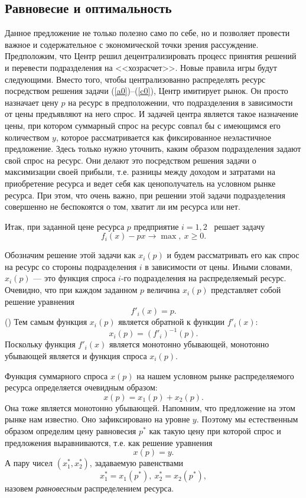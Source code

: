 \subsection{Равновесие и оптимальность}
 Данное предложение не только полезно само по себе, но и позволяет
провести важное и содержательное с экономической точки зрения рассуждение. Предположим, что
Центр решил децентрализировать процесс принятия решений и перевести подразделения на
<<хозрасчет>>. Новые правила игры будут следующими. Вместо того, чтобы централизованно
распределять ресурс посредством решения задачи (\ref{a0})--(\ref{c0}), Центр имитирует рынок.
Он просто назначает цену $p$ на ресурс в предположении, что подразделения в зависимости от
цены предъявляют на него спрос. И задачей центра является такое назначение цены, при котором
суммарный спрос на ресурс совпал бы с имеющимся его количеством $y$, которое рассматривается
как фиксированное неэластичное предложение. Здесь только нужно уточнить, каким образом
подразделения задают свой спрос на ресурс. Они делают это посредством решения задачи о
максимизации своей прибыли, т.е. разницы между доходом и затратами на приобретение ресурса и
ведет себя как ценополучатель на условном рынке ресурса. При этом, что очень важно, при
решении этой задачи подразделения совершенно не беспокоятся о том, хватит ли им ресурса или
нет.

Итак, при заданной цене ресурса $p$ предприятие $i=1,2$ \ решает
задачу
\begin{equation}
\label{max-pribili}
 f_{i}(x)-px\rightarrow\max,\ x\geqslant0.
\end{equation}


Обозначим решение этой задачи как $x_{i}(p)$ и будем рассматривать
его как спрос на ресурс со стороны подразделения $i$ в зависимости
от цены. Иными словами, $x_{i}(p)$ --- это функция спроса $i$-го
подразделения на распределяемый ресурс. Очевидно, что при каждом
заданном $p$ величина $x_{i}(p)$ представляет собой решение
уравнения
\[f'_{i}(x)=p.\]                ()
Тем самым функция $x_{i}(p)$ является обратной к функции $f'_{i}(x)$:
\begin{equation}
\label{fun-sprosa}
 x_{i}(p)=(f'_{i})^{-1}(p).
\end{equation}
Поскольку функция $f'_{i}(x)$ является монотонно убывающей,
монотонно убывающей является и функция спроса $x_{i}(p)$.

Функция суммарного спроса $x(p)$ на нашем условном рынке
распределяемого ресурса определяется очевидным образом:
\[x(p)=x_{1}(p)+x_{2}(p).\]
Она тоже является монотонно убывающей. Напомним, что предложение на
этом рынке нам известно. Оно зафиксировано на уровне $y$. Поэтому мы
естественным образом определим цену равновесия $p^{*}$ как такую
цену при которой спрос и предложения выравниваются, т.е. как решение
уравнения
\[x(p)=y.\]
А пару чисел $(x_{1}^{*},x_{2}^{*})$, задаваемую  равенствами
\[x_{1}^{*}=x_{1}(p^{*}),\  x_{2}^{*}=x_{2}(p^{*}),\]
назовем \emph{равновесным} распределением ресурса.

